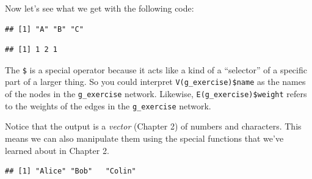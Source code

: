 \documentclass[
]{book}
\newenvironment{Shaded}{\begin{snugshade}}{\end{snugshade}}
\newcommand{\FunctionTok}[1]{\textcolor[rgb]{0.13,0.29,0.53}{\textbf{#1}}}
\newcommand{\NormalTok}[1]{#1}
\newcommand{\OtherTok}[1]{\textcolor[rgb]{0.56,0.35,0.01}{#1}}
\newcommand{\SpecialCharTok}[1]{\textcolor[rgb]{0.81,0.36,0.00}{\textbf{#1}}}
\newcommand{\StringTok}[1]{\textcolor[rgb]{0.31,0.60,0.02}{#1}}
\begin{document}
Now let's see what we get with the following code:

\begin{Shaded}
\end{Shaded}

\begin{verbatim}
## [1] "A" "B" "C"
\end{verbatim}

\begin{Shaded}
\end{Shaded}

\begin{verbatim}
## [1] 1 2 1
\end{verbatim}

The \texttt{\$} is a special operator because it acts like a kind of a ``selector'' of a specific part of a larger thing. So you could interpret \texttt{V(g\_exercise)\$name} as the names of the nodes in the \texttt{g\_exercise} network. Likewise, \texttt{E(g\_exercise)\$weight} refers to the weights of the edges in the \texttt{g\_exercise} network.

Notice that the output is a \emph{vector} (Chapter 2) of numbers and characters. This means we can also manipulate them using the special functions that we've learned about in Chapter 2.

\begin{Shaded}
\end{Shaded}

\begin{verbatim}
## [1] "Alice" "Bob"   "Colin"
\end{verbatim}
\end{document}

